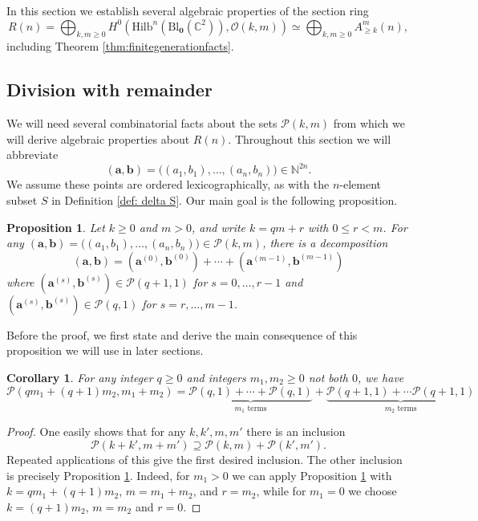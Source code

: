 \documentclass[12pt]{amsart}
\newcommand{\Hilb}{\mathrm{Hilb}}
\newcommand{\C}{\mathbb{C}}
\newcommand{\N}{\mathbb{N}}
\newcommand{\CO}{\mathcal{O}}
\newcommand{\aaa}{\mathbf{a}}
\newcommand{\bbb}{\mathbf{b}}
\newcommand{\Bl}{\mathrm{Bl}}
\numberwithin{equation}{section}
\newtheorem{proposition}[theorem]{Proposition}
\newtheorem{corollary}[theorem]{Corollary}
\theoremstyle{definition}
\begin{document}
In this section we establish several algebraic properties of the section ring 
\[ R(n)=\bigoplus_{k,m\geq 0} H^0\left(\Hilb^n\left(\Bl_{\mathbf{0}}\left(\C^2\right)\right),\CO(k,m)\right) \simeq \bigoplus_{k,m\geq 0} A^{m}_{\geq k}(n), \]
 including Theorem \ref{thm:finitegenerationfacts}.

\subsection{Division with remainder}\label{sec:division}

We will need several combinatorial facts about the sets $\mathcal{P}(k,m)$ from which we will derive algebraic properties about $R(n)$.
Throughout this section we will abbreviate
$$
(\aaa,\bbb)=\big( (a_1,b_1),\dots,(a_n,b_n) \big)\in \N^{2n}.
$$
We assume these points are ordered lexicographically, as with the $n$-element subset $S$ in Definition \ref{def: delta S}. Our main goal is the following proposition.

\begin{proposition}\label{prop:decomp}
    Let $k\geq 0$ and $m>0$, and write $k= qm+r$ with $0\leq r <m$. For any $(\aaa,\bbb) = \big( (a_1,b_1),\dots,(a_n,b_n) \big)\in \mathcal{P}(k,m)$, there is a decomposition $$(\aaa,\bbb) = \left(\aaa^{(0)},\bbb^{(0)}\right)+\cdots+\left(\aaa^{(m-1)},\bbb^{(m-1)}\right)$$ where $\left(\aaa^{(s)},\bbb^{(s)}\right)\in \mathcal{P}(q+1,1)$ for $s=0,\dots,r-1$ and $\left(\aaa^{(s)},\bbb^{(s)}\right)\in \mathcal{P}(q,1)$ for $s=r,\dots,m-1$.
\end{proposition}

Before the proof, we first state and derive the main consequence of this proposition we will use in later sections.

\begin{corollary}
    \label{cor:Minkowski decomp}
    For any integer $q\geq 0$ and integers $m_1,m_2\geq 0$ not both $0$, we have
    \[ \mathcal{P}(qm_1+(q+1)m_2,m_1+m_2) = \underbrace{\mathcal{P}(q,1)+\cdots+\mathcal{P}(q,1)}_{m_1 \text{ terms}}+\underbrace{\mathcal{P}(q+1,1)+\cdots \mathcal{P}(q+1,1)}_{m_2 \text{ terms}} \]
\end{corollary}

\begin{proof}
    One easily shows that for any $k,k',m,m'$ there is an inclusion
    \[ \mathcal{P}(k+k',m+m') \supseteq \mathcal{P}(k,m)+\mathcal{P}(k',m'). \]
    Repeated applications of this give the first desired inclusion. The other inclusion is precisely Proposition \ref{prop:decomp}. Indeed, for $m_1>0$ we can apply Proposition \ref{prop:decomp} with $k = qm_1+(q+1)m_2$, $m = m_1+m_2$, and $r=m_2$, while for $m_1=0$ we choose $k=(q+1)m_2$, $m=m_2$ and $r=0$.
\end{proof}
\end{document}

